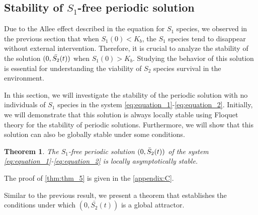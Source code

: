 \documentclass[10pt,letterpaper]{article}
\newtheorem{theorem}{Theorem}
\begin{document}
\subsection{Stability of $S_1$-free periodic solution}
\label{sec:stability}
Due to the Allee effect described in the equation for $S_1$ species, we observed in the previous section that when $S_1(0) < K_b$, the $S_1$ species tend to disappear without external intervention. Therefore, it is crucial to analyze the stability of the solution $(0, \Bar{S_2}(t))$ when $S_1(0) > K_b$. Studying the behavior of this solution is essential for understanding the viability of $S_2$ species survival in the environment.

In this section, we will investigate the stability of the periodic solution with no individuals of $S_1$ species in the system  \eqref{eq:equation_1}-\eqref{eq:equation_2}. Initially, we will demonstrate that this solution is always locally stable using Floquet theory for the stability of periodic solutions. Furthermore, we will show that this solution can also be globally stable under some conditions. 
\begin{theorem}\label{thm:thm_5}
    The $S_1$-free periodic solution $(0,\Bar{S}_2(t))$ of the system \eqref{eq:equation_1}-\eqref{eq:equation_2} is locally asymptotically stable.
\end{theorem}
The proof of \eqref{thm:thm_5} is given in the \eqref{appendix:C}.

Similar to the previous result, we present a theorem that establishes the conditions under which $(0, \bar{S_2}(t))$ is a global attractor.
\end{document}
